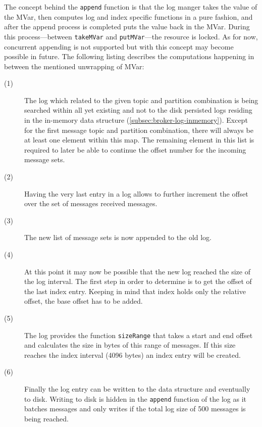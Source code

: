 The concept behind the \lstinline{append} function is that the log manger takes
the value of the MVar, then computes log and index specific functions in a pure
fashion, and after the append process is completed puts the value back in the
MVar.  During this process---between \lstinline{takeMVar} and
\lstinline{putMVar}---the resource is locked. As for now, concurrent appending
is not supported but with this concept may become possible in future. The
following listing describes the computations happening in between the mentioned
unwrapping of MVar:

\begin{description}
  \item[(1)]

    The log which related to the given topic and partition combination is being
    searched within all yet existing and not to the disk persisted logs residing
    in the in-memory data structure (\ref{subsec:broker-log-inmemory}). Except
    for the first message topic and partition combination, there will always be
    at least one element within this map. The remaining element in this list is
    required to later be able to continue the offset number for the incoming
    message sets.

  \item[(2)]

    Having the very last entry in a log allows to further increment the offset
    over the set of messages received messages.

  \item[(3)]

    The new list of message sets is now appended to the old log.

  \item[(4)]

    At this point it may now be possible that the new log reached the size of
    the log interval. The first step in order to determine is to get the offset
    of the last index entry. Keeping in mind that index holds only the relative
    offset, the base offset has to be added.

  \item[(5)]

    The log provides the function \lstinline{sizeRange} that takes a start and
    end offset and calculates the size in bytes of this range of messages. If
    this size reaches the index interval (4096 bytes) an index entry will be
    created.

  \item[(6)]

    Finally the log entry can be written to the data structure and eventually to
    disk. Writing to disk is hidden in the \lstinline{append} function of the
    log as it batches messages and only writes if the total log size of 500
    messages is being reached.

\end{description}

